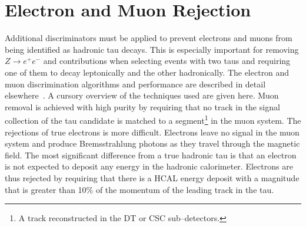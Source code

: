 \section{Electron and Muon Rejection}
\label{sec:LightLeptonRejection} Additional discriminators must be applied to
prevent electrons and muons from being identified as hadronic tau decays.  This
is especially important for removing $Z\to e^+e^-$ and \ZMM contributions when
selecting events with two taus and requiring one of them to decay leptonically
and the other hadronically.  The electron and muon discrimination algorithms and
performance are described in detail elsewhere~\cite{CMS-PAS-PFT-08-001}.  A cursory
overview of the techniques used are given here.  Muon removal is achieved with
high purity by requiring that no track in the signal collection of the tau
candidate is matched to a segment\footnote{A track reconstructed in the DT or
CSC sub--detectors.} in the muon system.  The rejections of true electrons is
more difficult.  Electrons leave no signal in the muon system and produce
Bremsstrahlung photons as they travel through the magnetic field.  The most
significant difference from a true hadronic tau is that an electron is not
expected to deposit any energy in the hadronic calorimeter.  Electrons are thus
rejected by requiring that there is a HCAL energy deposit with a magnitude that
is greater than 10\% of the momentum of the leading track in the tau.

\ifx\master\undefined\fi
